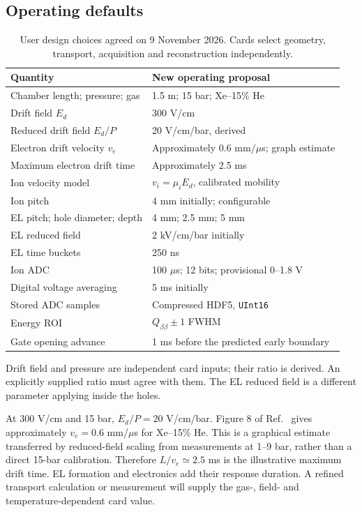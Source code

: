 \documentclass[11pt,a4paper]{article}
\newcommand{\Qbb}{Q_{\beta\beta}}
\begin{document}
\subsection{Operating defaults}
\begin{table}[htbp]\centering\small
\begin{tabular}{p{.47\linewidth}p{.43\linewidth}}
\toprule
Quantity & New operating proposal\\\midrule
Chamber length; pressure; gas & 1.5 m; 15 bar; Xe--15\% He\\
Drift field $E_d$ & 300 V/cm\\
Reduced drift field $E_d/P$ & 20 V/cm/bar, derived\\
Electron drift velocity $v_e$ & Approximately 0.6 mm/$\mu$s; graph estimate\\
Maximum electron drift time & Approximately 2.5 ms\\
Ion velocity model & $v_i=\mu_i E_d$, calibrated mobility\\
Ion pitch & 4 mm initially; configurable\\
EL pitch; hole diameter; depth & 4 mm; 2.5 mm; 5 mm\\
EL reduced field & 2 kV/cm/bar initially\\
EL time buckets & 250 ns\\
Ion ADC & 100 $\mu$s; 12 bits; provisional 0--1.8 V\\
Digital voltage averaging & 5 ms initially\\
Stored ADC samples & Compressed HDF5, \texttt{UInt16}\\
Energy ROI & $\Qbb\pm1$ FWHM\\
Gate opening advance & 1 ms before the predicted early boundary\\
\bottomrule
\end{tabular}
\caption{User design choices agreed on 9 November 2026. Cards select geometry,
transport, acquisition and reconstruction independently.}
\label{tab:defaults}
\end{table}
Drift field and pressure are independent card inputs; their ratio is derived.
An explicitly supplied ratio must agree with them. The EL reduced field is a
different parameter applying inside the holes.

At 300 V/cm and 15 bar, $E_d/P=20$ V/cm/bar. Figure 8 of
Ref.~\cite{McDonald_2019} gives approximately $v_e=0.6$ mm/$\mu$s for Xe--15\%
He. This is a graphical estimate transferred by reduced-field scaling from
measurements at 1--9 bar, rather than a direct 15-bar calibration. Therefore
$L/v_e\simeq2.5$ ms is the illustrative maximum drift time. EL formation and
electronics add their response duration. A refined transport calculation or
measurement will supply the gas-, field- and temperature-dependent card value.
\end{document}

